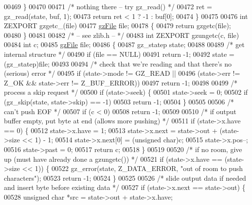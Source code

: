 \begin{DoxyCode}
00469     \}
00470 
00471     \textcolor{comment}{/* nothing there -- try gz\_read() */}
00472     ret = gz\_read(state, buf, 1);
00473     \textcolor{keywordflow}{return} ret < 1 ? -1 : buf[0];
00474 \}
00475 
00476 \textcolor{keywordtype}{int} ZEXPORT gzgetc\_(file)
00477 \hyperlink{structgz_file__s}{gzFile} file;
00478 \{
00479     \textcolor{keywordflow}{return} gzgetc(file);
00480 \}
00481 
00482 \textcolor{comment}{/* -- see zlib.h -- */}
00483 \textcolor{keywordtype}{int} ZEXPORT gzungetc(c, file)
00484     \textcolor{keywordtype}{int} c;
00485     \hyperlink{structgz_file__s}{gzFile} file;
00486 \{
00487     gz\_statep state;
00488 
00489     \textcolor{comment}{/* get internal structure */}
00490     \textcolor{keywordflow}{if} (file == NULL)
00491         \textcolor{keywordflow}{return} -1;
00492     state = (gz\_statep)file;
00493 
00494     \textcolor{comment}{/* check that we're reading and that there's no (serious) error */}
00495     \textcolor{keywordflow}{if} (state->mode != GZ\_READ ||
00496         (state->err != Z\_OK && state->err != Z\_BUF\_ERROR))
00497         \textcolor{keywordflow}{return} -1;
00498 
00499     \textcolor{comment}{/* process a skip request */}
00500     \textcolor{keywordflow}{if} (state->seek) \{
00501         state->seek = 0;
00502         \textcolor{keywordflow}{if} (gz\_skip(state, state->skip) == -1)
00503             \textcolor{keywordflow}{return} -1;
00504     \}
00505 
00506     \textcolor{comment}{/* can't push EOF */}
00507     \textcolor{keywordflow}{if} (c < 0)
00508         \textcolor{keywordflow}{return} -1;
00509 
00510     \textcolor{comment}{/* if output buffer empty, put byte at end (allows more pushing) */}
00511     \textcolor{keywordflow}{if} (state->x.have == 0) \{
00512         state->x.have = 1;
00513         state->x.next = state->out + (state->size << 1) - 1;
00514         state->x.next[0] = (\textcolor{keywordtype}{unsigned} char)c;
00515         state->x.pos--;
00516         state->past = 0;
00517         \textcolor{keywordflow}{return} c;
00518     \}
00519 
00520     \textcolor{comment}{/* if no room, give up (must have already done a gzungetc()) */}
00521     \textcolor{keywordflow}{if} (state->x.have == (state->size << 1)) \{
00522         gz\_error(state, Z\_DATA\_ERROR, \textcolor{stringliteral}{"out of room to push characters"});
00523         \textcolor{keywordflow}{return} -1;
00524     \}
00525 
00526     \textcolor{comment}{/* slide output data if needed and insert byte before existing data */}
00527     \textcolor{keywordflow}{if} (state->x.next == state->out) \{
00528         \textcolor{keywordtype}{unsigned} \textcolor{keywordtype}{char} *src = state->out + state->x.have;

\end{DoxyCode}
